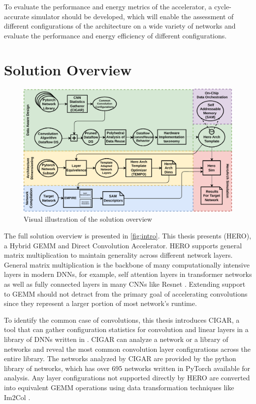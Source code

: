 To evaluate the performance and
energy metrics of the accelerator, a cycle-accurate simulator should be
developed, which will enable the assessment of different configurations of the
architecture on a wide variety of networks and evaluate the performance and
energy efficiency of different configurations.

\section{Solution Overview}
\label{chap:intro:solution_overview}

\begin{figure}[!ht]
  \centering
  \includegraphics[scale=0.8]{fig/intro_alt.pdf}
  \caption{Visual illustration of the solution overview}
  \label{fig:intro}
\end{figure}


The full solution overview is presented in \autoref{fig:intro}. This thesis
presents (HERO), a Hybrid GEMM and Direct Convolution Accelerator.  
HERO supports general matrix multiplication to maintain generality across
different network layers. General matrix multiplication is the backbone of many
computationally intensive layers in modern DNNs, for example, self attention
layers in transformer networks \cite{transformer_model} as well as fully
connected layers in many CNNs like Resnet \cite{resnet}. Extending support to
GEMM should not detract from the primary goal of accelerating convolutions since
they represent a larger portion of most network's runtime.  


To identify the common case of convolutions, this thesis
introduces CIGAR, a tool that can gather configuration statistics for
convolution and linear layers in a library of DNNs written in \cite{pytorch}.
CIGAR can analyze a network or a library of networks and reveal the most common
convolution layer configurations across the entire library. The networks
analyzed by CIGAR are provided by the \cite{timm} python library of networks,
which has over 695 networks written in PyTorch available for analysis. Any layer
configurations not supported directly by HERO are converted into equivalent GEMM
operations using data transformation techniques like Im2Col
\cite{cafe_con_troll}.


